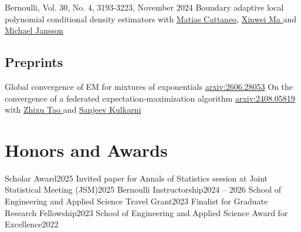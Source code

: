 \documentclass[10pt,a4paper,roman]{moderncv}        %
\begin{document}
\cventry{}
{Bernoulli, Vol. 30, No. 4, 3193-3223, November 2024}
{Boundary adaptive local polynomial conditional density estimators}
{}
{}
{with \color{blue}\href{https://mdcattaneo.github.io}{Matias Cattaneo}\color{black},
  \color{blue}\href{https://sites.google.com/view/xinweima/home?authuser=0}{Xinwei
    Ma }\color{black}
  and
  \color{blue}\href{https://sites.google.com/berkeley.edu/michael-jansson/}{Michael
    Jansson}\color{black}
}

\subsection{Preprints}
{Global convergence of EM for mixtures of exponentials}
{\color{blue}\href{https://arxiv.org/abs/2606.28053}{arxiv:2606.28053}\color{black}}
{}{}
\cventry{}
{\vspace{-0.4cm}}
{On the convergence of a federated expectation-maximization algorithm}
{\color{blue}\href{https://arxiv.org/abs/2408.05819}{arxiv:2408.05819}\color{black}}
{}
{with
  \color{blue}\href{https://www.linkedin.com/in/zhixu-tao-a02b77199/}{Zhixu Tao }\color{black} and
  \color{blue}\href{https://www.princeton.edu/~kulkarni/}{Sanjeev Kulkarni}
}



\vspace{-0.3cm}
\section{Honors and Awards}
{Scholar Award}{2025}
{}{}
{Invited paper for Annals of Statistics session at Joint Statistical Meeting (JSM)}{2025}
{}{}
{Bernoulli Instructorship}{2024 -- 2026}
{}{}
{School of Engineering and Applied Science Travel Grant}{2023}
{}{}
{Finalist for Graduate Research Fellowship}{2023}
{}{}
{School of Engineering and Applied Science Award for Excellence}{2022}
{}{}
\end{document}
